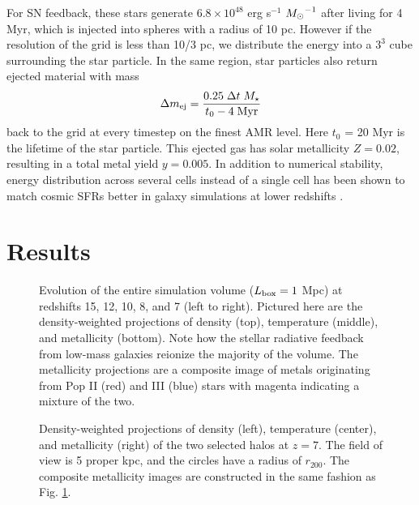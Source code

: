 \documentclass[apj]{emulateapj}
\begin{document}
For SN feedback, these stars generate $6.8 \times 10^{48}$ erg
s$^{-1}$ $\Ms^{-1}$ after living for 4 Myr, which is injected into
spheres with a radius of 10 pc.  However if the resolution of the grid
is less than 10/3 pc, we distribute the energy into a $3^3$ cube
surrounding the star particle.  In the same region, star particles
also return ejected material with mass
%
\begin{equation}
  \label{eqn:SNmass}
  \Delta m_{\rm ej} = \frac{0.25 \; \Delta t \; M_\star} 
         {t_0 - 4\;\mathrm{Myr}}
\end{equation}
back to the grid at every timestep on the finest AMR level.  Here
$t_0$ = 20 Myr is the lifetime of the star particle.  This ejected gas
has solar metallicity $Z = 0.02$, resulting in a total metal yield $y
= 0.005$.  In addition to numerical stability, energy distribution
across several cells instead of a single cell has been shown to match
cosmic SFRs better in galaxy simulations at lower redshifts
\citep{Smith11}.

\section{Results}
\label{sec:results}


\begin{figure*}
  \caption{\label{fig:evo-mosaic} Evolution of the entire simulation
    volume ($L_{\rm box} = 1$ Mpc) at redshifts 15, 12, 10, 8, and 7
    (left to right).  Pictured here are the density-weighted
    projections of density (top), temperature (middle), and
    metallicity (bottom).  Note how the stellar radiative feedback
    from low-mass galaxies reionize the majority of the volume.  The
    metallicity projections are a composite image of metals
    originating from Pop II (red) and III (blue) stars with magenta
    indicating a mixture of the two.}
\end{figure*}



\begin{figure}
  \caption{\label{fig:halo-mosaic} Density-weighted projections of
    density (left), temperature (center), and metallicity (right) of
    the two selected halos at $z=7$.  The field of view is 5 proper
    kpc, and the circles have a radius of $r_{200}$.  The composite
    metallicity images are constructed in the same fashion as
    Fig. \ref{fig:evo-mosaic}.}
\end{figure}
\end{document}
